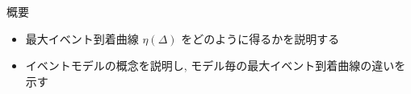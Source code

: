 
\begin{frame}{概要}
    \begin{itemize}
        \item 最大イベント到着曲線 $\eta(\Delta)$ をどのように得るかを説明する
        \item イベントモデルの概念を説明し, モデル毎の最大イベント到着曲線の違いを示す
    \end{itemize}
\end{frame}
